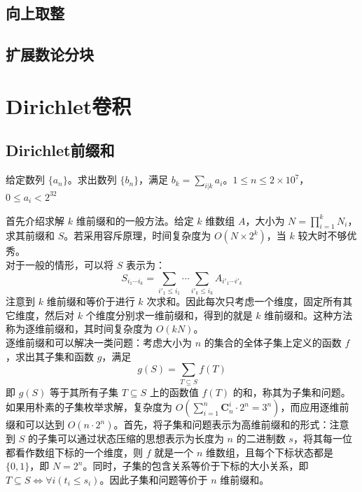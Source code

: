 \documentclass[12pt,a4paper]{article}
\begin{document}
\subsection{向上取整}
\subsection{扩展数论分块}

\newpage
\section{Dirichlet卷积}
\subsection{Dirichlet前缀和}
\begin{mdframed}[leftline=true, linewidth=2pt, linecolor=gray]
	给定数列 $\{a_n\}$。求出数列 $\{b_n\}$，满足 $\displaystyle b_k=\sum_{i|k}a_i$。$1\leq n\leq 2\times 10^7$，$0\leq a_i< 2^{32}$
\end{mdframed}
首先介绍求解 $k$ 维前缀和的一般方法。给定 $k$ 维数组 $A$，大小为 $\displaystyle N=\prod_{i=1}^{k}{N_i}$，求其前缀和 $S$。若采用容斥原理，时间复杂度为 $O(N\times2^k)$，当 $k$ 较大时不够优秀。\\
对于一般的情形，可以将 $S$ 表示为：
\begin{equation*}
	\displaystyle S_{i_1\cdots i_k}=\sum_{i'_1\le i_1}\cdots\sum_{i'_k\le i_k}A_{i'_1\cdots i'_k}
\end{equation*}
注意到 $k$ 维前缀和等价于进行 $k$ 次求和。因此每次只考虑一个维度，固定所有其它维度，然后对 $k$ 个维度分别求一维前缀和，得到的就是 $k$ 维前缀和。这种方法称为逐维前缀和，其时间复杂度为 $O(kN)$。\\
逐维前缀和可以解决一类问题：考虑大小为 $n$ 的集合的全体子集上定义的函数 $f$，求出其子集和函数 $g$，满足
\begin{equation*}
	\displaystyle g(S)=\sum_{T\subseteq S}f(T)
\end{equation*}
即 $g(S)$ 等于其所有子集 $T\subseteq S$ 上的函数值 $f(T)$ 的和，称其为子集和问题。\\
如果用朴素的子集枚举求解，复杂度为 $\displaystyle O(\sum_{i=1}^{n}\mathbf{C}_{n}^{i}\cdot2^n=3^n)$，而应用逐维前缀和可以达到 $O(n\cdot2^n)$。首先，将子集和问题表示为高维前缀和的形式：注意到 $S$ 的子集可以通过状态压缩的思想表示为长度为 $n$ 的二进制数 $s$，将其每一位都看作数组下标的一个维度，则 $f$ 就是一个 $n$ 维数组，且每个下标状态都是 $\{0,1\}$，即 $N=2^n$。同时，子集的包含关系等价于下标的大小关系，即 $T\subseteq S\iff\forall i(t_i\le s_i)$。因此子集和问题等价于 $n$ 维前缀和。
\end{document}

